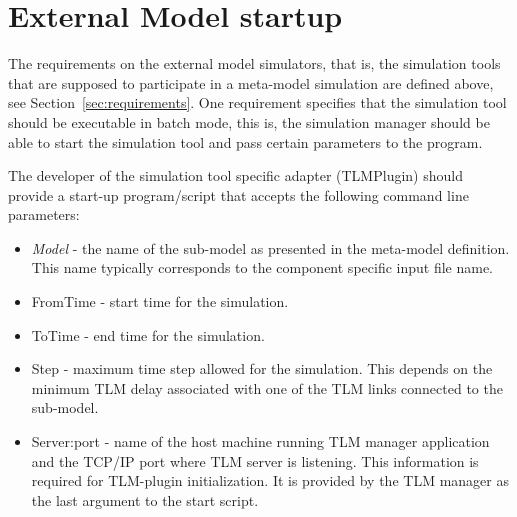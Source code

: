 \section{External Model startup}
\label{xmodel-startup}
The requirements on the external model simulators, that is, the
simulation tools that are supposed to participate in a meta-model
simulation are defined above, see Section~\ref{sec:requirements}. One
requirement specifies that the simulation tool should be executable in
batch mode, this is, the simulation manager should be able to start
the simulation tool and pass certain parameters to the program.

The developer of the simulation tool specific adapter (TLMPlugin)
should provide a start-up program/script that accepts the following
command line parameters:
\begin{itemize}
\item \emph{Model} - the name of the sub-model as presented in the
meta-model definition. This name typically corresponds to the
component specific input file name.
\item {FromTime} - start time for the simulation.
\item {ToTime} - end time for the simulation.
\item {Step} - maximum time step allowed for the simulation. This depends on
the minimum TLM delay associated with one of the TLM links connected to the sub-model.
\item {Server:port} - name of the host machine running TLM manager application and
the TCP/IP port where TLM server is listening. This information is required for
TLM-plugin initialization. It is provided by the TLM manager as the last
argument to the start script.
\end{itemize}

